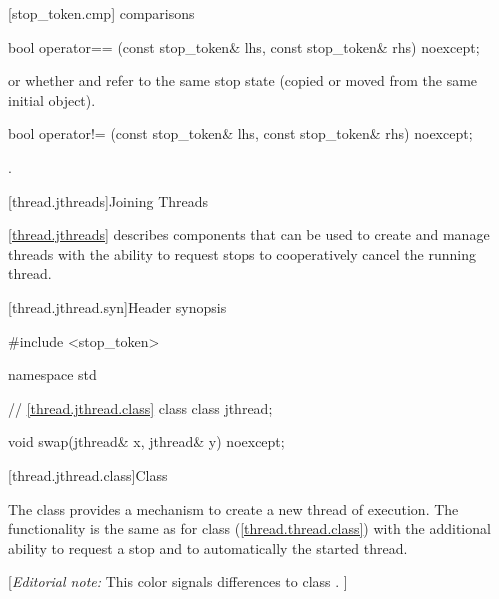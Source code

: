 {%
[stop_token.cmp]{ comparisons}

%
\begin{itemdecl}
bool operator== (const stop_token& lhs, const stop_token& rhs) noexcept;
\end{itemdecl}
\begin{itemdescr}
  \pnum\returns {} or
                whether  and  refer to the
                same stop state
                (copied or moved from the same initial  object).
\end{itemdescr}

%
\begin{itemdecl}
bool operator!= (const stop_token& lhs, const stop_token& rhs) noexcept;
\end{itemdecl}
\begin{itemdescr}
  \pnum\returns {}.
\end{itemdescr}


\clearpage

[thread.jthreads]{Joining Threads}


\pnum
\ref{thread.jthreads} describes components that can be used to create and manage threads
with the ability to request stops to cooperatively cancel the running thread.

[thread.jthread.syn]{Header  synopsis}
%

\begin{codeblock}
#include <stop_token>

namespace std {
  // \ref{thread.jthread.class} class 
  class jthread;

  void swap(jthread& x, jthread& y) noexcept;
}
\end{codeblock}


[thread.jthread.class]{Class }

\pnum
The class  provides a mechanism
to create a new thread of execution.
The functionality is the same as for class  (\ref{thread.thread.class})
with the additional ability to request a stop and to
automatically  the started thread.

{\color{blue}
[{\itshape{}Editorial note:} {\color{diffcolor}This color signals differences to class .} ]
}

}
